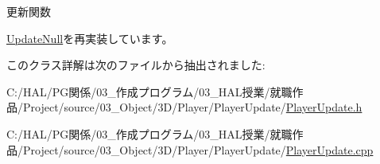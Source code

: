 更新関数 



\mbox{\hyperlink{class_update_null_a692f4f34e4ef35ca286a1d3606fdf473}{Update\+Null}}を再実装しています。



このクラス詳解は次のファイルから抽出されました\+:\begin{DoxyCompactItemize}
\item 
C\+:/\+H\+A\+L/\+P\+G関係/03\+\_\+作成プログラム/03\+\_\+\+H\+A\+L授業/就職作品/\+Project/source/03\+\_\+\+Object/3\+D/\+Player/\+Player\+Update/\mbox{\hyperlink{_player_update_8h}{Player\+Update.\+h}}\item 
C\+:/\+H\+A\+L/\+P\+G関係/03\+\_\+作成プログラム/03\+\_\+\+H\+A\+L授業/就職作品/\+Project/source/03\+\_\+\+Object/3\+D/\+Player/\+Player\+Update/\mbox{\hyperlink{_player_update_8cpp}{Player\+Update.\+cpp}}\end{DoxyCompactItemize}
